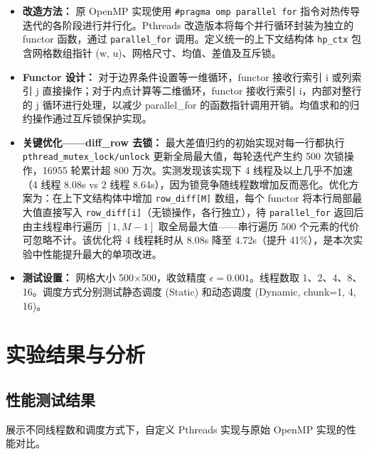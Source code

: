\documentclass{SYSUReport}
\begin{document}
\begin{itemize}
    \item \textbf{改造方法：} 原 OpenMP 实现使用 \texttt{\#pragma omp parallel for} 指令对热传导迭代的各阶段进行并行化。Pthreads 改造版本将每个并行循环封装为独立的 functor 函数，通过 \texttt{parallel\_for} 调用。定义统一的上下文结构体 \texttt{hp\_ctx} 包含网格数组指针 (w, u)、网格尺寸、均值、差值及互斥锁。
    \item \textbf{Functor 设计：} 对于边界条件设置等一维循环，functor 接收行索引 i 或列索引 j 直接操作；对于内点计算等二维循环，functor 接收行索引 i，内部对整行的 j 循环进行处理，以减少 parallel\_for 的函数指针调用开销。均值求和的归约操作通过互斥锁保护实现。
    \item \textbf{关键优化——diff\_row 去锁：} 最大差值归约的初始实现对每一行都执行 \texttt{pthread\_mutex\_lock/unlock} 更新全局最大值，每轮迭代产生约 500 次锁操作，16955 轮累计超 800 万次。实测发现该实现下 4 线程及以上几乎不加速（4 线程 8.08s vs 2 线程 8.64s），因为锁竞争随线程数增加反而恶化。优化方案为：在上下文结构体中增加 \texttt{row\_diff[M]} 数组，每个 functor 将本行局部最大值直接写入 \texttt{row\_diff[i]}（无锁操作，各行独立），待 \texttt{parallel\_for} 返回后由主线程串行遍历 $[1, M-1]$ 取全局最大值——串行遍历 500 个元素的代价可忽略不计。该优化将 4 线程耗时从 8.08s 降至 4.72s（提升 41\%），是本次实验中性能提升最大的单项改进。
    \item \textbf{测试设置：} 网格大小 500×500，收敛精度 $\epsilon = 0.001$。线程数取 1、2、4、8、16。调度方式分别测试静态调度 (Static) 和动态调度 (Dynamic, chunk=1, 4, 16)。
\end{itemize}

\newpage
\section{实验结果与分析}

\subsection{性能测试结果}
展示不同线程数和调度方式下，自定义 Pthreads 实现与原始 OpenMP 实现的性能对比。
\end{document}
